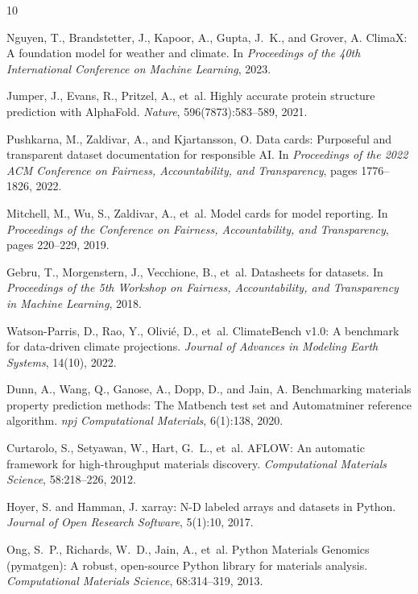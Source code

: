 \documentclass[11pt,letterpaper,twocolumn]{article}
\begin{document}

\begin{thebibliography}{10}

Nguyen, T., Brandstetter, J., Kapoor, A., Gupta, J.~K., and Grover, A.
\newblock ClimaX: A foundation model for weather and climate.
\newblock In \emph{Proceedings of the 40th International Conference on Machine Learning}, 2023.

Jumper, J., Evans, R., Pritzel, A., et~al.
\newblock Highly accurate protein structure prediction with AlphaFold.
\newblock \emph{Nature}, 596(7873):583--589, 2021.

Pushkarna, M., Zaldivar, A., and Kjartansson, O.
\newblock Data cards: Purposeful and transparent dataset documentation for responsible AI.
\newblock In \emph{Proceedings of the 2022 ACM Conference on Fairness, Accountability, and Transparency}, pages 1776--1826, 2022.

Mitchell, M., Wu, S., Zaldivar, A., et~al.
\newblock Model cards for model reporting.
\newblock In \emph{Proceedings of the Conference on Fairness, Accountability, and Transparency}, pages 220--229, 2019.

Gebru, T., Morgenstern, J., Vecchione, B., et~al.
\newblock Datasheets for datasets.
\newblock In \emph{Proceedings of the 5th Workshop on Fairness, Accountability, and Transparency in Machine Learning}, 2018.

Watson-Parris, D., Rao, Y., Olivié, D., et~al.
\newblock ClimateBench v1.0: A benchmark for data-driven climate projections.
\newblock \emph{Journal of Advances in Modeling Earth Systems}, 14(10), 2022.

Dunn, A., Wang, Q., Ganose, A., Dopp, D., and Jain, A.
\newblock Benchmarking materials property prediction methods: The Matbench test set and Automatminer reference algorithm.
\newblock \emph{npj Computational Materials}, 6(1):138, 2020.

Curtarolo, S., Setyawan, W., Hart, G.~L., et~al.
\newblock AFLOW: An automatic framework for high-throughput materials discovery.
\newblock \emph{Computational Materials Science}, 58:218--226, 2012.

Hoyer, S. and Hamman, J.
\newblock xarray: N-D labeled arrays and datasets in Python.
\newblock \emph{Journal of Open Research Software}, 5(1):10, 2017.

Ong, S.~P., Richards, W.~D., Jain, A., et~al.
\newblock Python Materials Genomics (pymatgen): A robust, open-source Python library for materials analysis.
\newblock \emph{Computational Materials Science}, 68:314--319, 2013.

\end{thebibliography}
\end{document}
